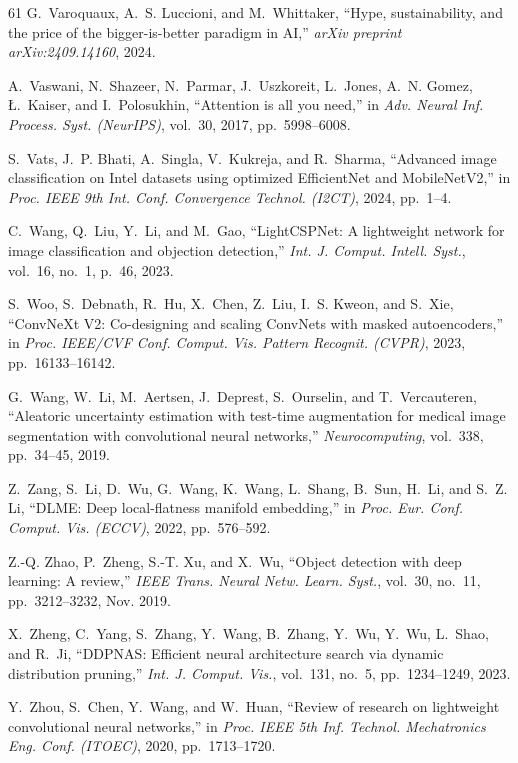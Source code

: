 \begin{thebibliography}{61}
G.~Varoquaux, A.~S. Luccioni, and M.~Whittaker, ``Hype, sustainability, and the price of the bigger-is-better paradigm in AI,'' \emph{arXiv preprint arXiv:2409.14160}, 2024.

A.~Vaswani, N.~Shazeer, N.~Parmar, J.~Uszkoreit, L.~Jones, A.~N. Gomez, {\L}.~Kaiser, and I.~Polosukhin, ``Attention is all you need,'' in \emph{Adv. Neural Inf. Process. Syst. (NeurIPS)}, vol.~30, 2017, pp.~5998--6008.

S.~Vats, J.~P. Bhati, A.~Singla, V.~Kukreja, and R.~Sharma, ``Advanced image classification on Intel datasets using optimized EfficientNet and MobileNetV2,'' in \emph{Proc. IEEE 9th Int. Conf. Convergence Technol. (I2CT)}, 2024, pp.~1--4. 

C.~Wang, Q.~Liu, Y.~Li, and M.~Gao, ``LightCSPNet: A lightweight network for image classification and objection detection,'' \emph{Int. J. Comput. Intell. Syst.}, vol.~16, no.~1, p.~46, 2023. 

S.~Woo, S.~Debnath, R.~Hu, X.~Chen, Z.~Liu, I.~S. Kweon, and S.~Xie, ``ConvNeXt V2: Co-designing and scaling ConvNets with masked autoencoders,'' in \emph{Proc. IEEE/CVF Conf. Comput. Vis. Pattern Recognit. (CVPR)}, 2023, pp.~16133--16142.

G.~Wang, W.~Li, M.~Aertsen, J.~Deprest, S.~Ourselin, and T.~Vercauteren, ``Aleatoric uncertainty estimation with test-time augmentation for medical image segmentation with convolutional neural networks,'' \emph{Neurocomputing}, vol.~338, pp.~34--45, 2019. 

Z.~Zang, S.~Li, D.~Wu, G.~Wang, K.~Wang, L.~Shang, B.~Sun, H.~Li, and S.~Z. Li, ``DLME: Deep local-flatness manifold embedding,'' in \emph{Proc. Eur. Conf. Comput. Vis. (ECCV)}, 2022, pp.~576--592.

Z.-Q. Zhao, P.~Zheng, S.-T. Xu, and X.~Wu, ``Object detection with deep learning: A review,'' \emph{IEEE Trans. Neural Netw. Learn. Syst.}, vol.~30, no.~11, pp.~3212--3232, Nov. 2019. 

X.~Zheng, C.~Yang, S.~Zhang, Y.~Wang, B.~Zhang, Y.~Wu, Y.~Wu, L.~Shao, and R.~Ji, ``DDPNAS: Efficient neural architecture search via dynamic distribution pruning,'' \emph{Int. J. Comput. Vis.}, vol.~131, no.~5, pp.~1234--1249, 2023. 

Y.~Zhou, S.~Chen, Y.~Wang, and W.~Huan, ``Review of research on lightweight convolutional neural networks,'' in \emph{Proc. IEEE 5th Inf. Technol. Mechatronics Eng. Conf. (ITOEC)}, 2020, pp.~1713--1720. 


\end{thebibliography}
